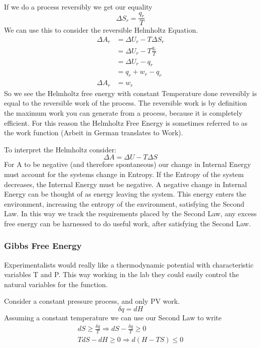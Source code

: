\documentclass{article}
\newcommand{\be}{\begin{equation}}
\newcommand{\ee}{\end{equation}}
\begin{document}
If we do a process reversibly we get our equality
\begin{equation}
    \Delta S_r = \frac{q_r}{T}
\end{equation}
We can use this to consider the reversible Helmholtz Equation. 
\begin{equation}
    \begin{split}
        \Delta A_r &= \Delta U_r - T\Delta S_r \\
        &= \Delta U_r - T\frac{q_r}{T} \\
        &= \Delta U_r - q_r \\
        &= q_r + w_r - q_r \\
        \Delta A_r &= w_r
    \end{split}
\end{equation}
So we see the Helmholtz free energy with constant Temperature done reversibly is equal to the reversible work of the process. 
The reversible work is by definition the maximum work you can generate from a process, because it is completely efficient. 
For this reason the Helmholtz Free Energy is sometimes referred to as the work function (Arbeit in German translates to Work). 

To interpret the Helmholtz consider:
\be
\Delta A = \Delta U - T\Delta S
\ee
For A to be negative (and therefore spontaneous) our change in Internal Energy must account for the systems change in Entropy. 
If the Entropy of the system decreases, the Internal Energy must be negative.
A negative change in Internal Energy can be thought of as energy leaving the system.
This energy enters the environment, increasing the entropy of the environment, satisfying the Second Law. 
In this way we track the requirements placed by the Second Law, any excess free energy can be harnessed to do useful work, after satisfying the Second Law.

\subsubsection*{Gibbs Free Energy}
Experimentalists would really like a thermodynamic potential with characteristic variables T and P. 
This way working in the lab they could easily control the natural variables for the function. 

Consider a constant pressure process, and only PV work.  
\begin{equation}
    \delta q = dH 
\end{equation}
Assuming a constant temperature we can use our Second Law to write
\be
\begin{split}
dS \geq \frac{\delta q}{T} \Rightarrow dS - \frac{\delta q}{T} \geq 0\\
TdS - dH \geq 0 \Rightarrow d(H-TS) \leq 0
\end{split}
\ee
\end{document}
